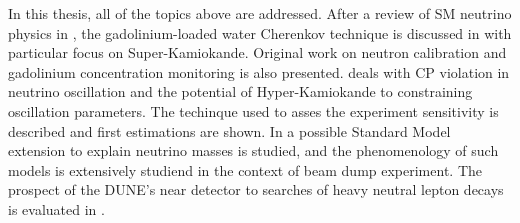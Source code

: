 In this thesis, all of the topics above are addressed.
After a review of SM neutrino physics in , the gadolinium-loaded water Cherenkov technique %
is discussed in  with particular focus on Super-Kamiokande.
Original work on neutron calibration and gadolinium concentration monitoring is also presented.
 deals with CP violation in neutrino oscillation and the potential of Hyper-Kamiokande to %
constraining oscillation parameters.
The techinque used to asses the experiment sensitivity is described and first estimations are shown.	%
In  a possible Standard Model extension to explain neutrino masses is studied, %
and the phenomenology of such models is extensively studiend in the context of beam dump experiment.
The prospect of the DUNE's near detector to searches of heavy neutral lepton decays is evaluated in .
